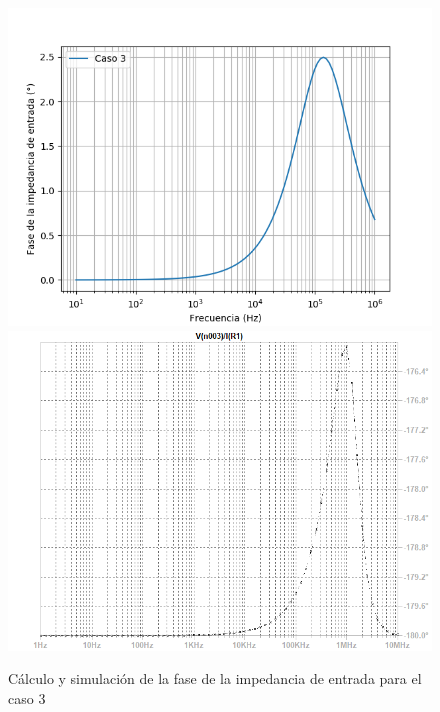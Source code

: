 \begin{figure}[H]
\begin{centering}
\includegraphics[scale=0.5]{../Ex1/iA/Resources1a/zinpp3}\includegraphics[scale=0.4]{../Ex1/iA/Resources1a/zinpp3_sim}
\par\end{centering}
\caption{Cálculo y simulación de la fase de la impedancia de entrada para el
caso 3}
\end{figure}

